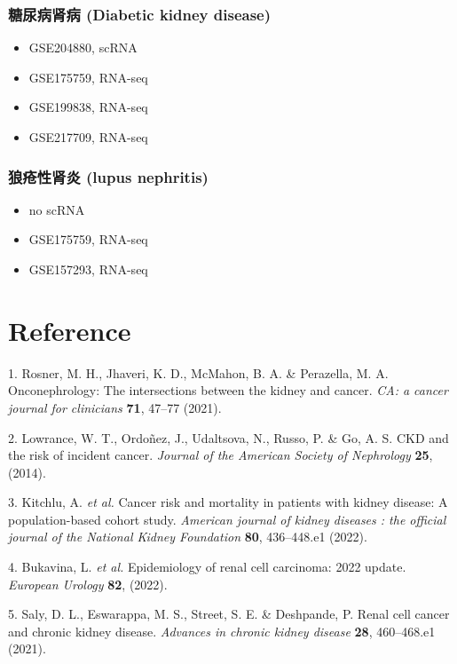 \documentclass[
]{article}
\providecommand{\tightlist}{%
  \setlength{\itemsep}{0pt}\setlength{\parskip}{0pt}}
\newenvironment{cslreferences}%
  {}%
  {\par}
\begin{document}
\hypertarget{ux7cd6ux5c3fux75c5ux80beux75c5-diabetic-kidney-disease}{%
\subsubsection{糖尿病肾病 (Diabetic kidney disease)}\label{ux7cd6ux5c3fux75c5ux80beux75c5-diabetic-kidney-disease}}

\begin{itemize}
\tightlist
\item
  GSE204880, scRNA
\item
  GSE175759, RNA-seq
\item
  GSE199838, RNA-seq
\item
  GSE217709, RNA-seq
\end{itemize}

\hypertarget{ux72fcux75aeux6027ux80beux708e-lupus-nephritis}{%
\subsubsection{狼疮性肾炎 (lupus nephritis)}\label{ux72fcux75aeux6027ux80beux708e-lupus-nephritis}}

\begin{itemize}
\tightlist
\item
  no scRNA
\item
  GSE175759, RNA-seq
\item
  GSE157293, RNA-seq
\end{itemize}

\hypertarget{bibliography}{%
\section*{Reference}\label{bibliography}}

\hypertarget{refs}{}
\begin{cslreferences}
\leavevmode\hypertarget{ref-OnconephrologyRosner2021}{}%
1. Rosner, M. H., Jhaveri, K. D., McMahon, B. A. \& Perazella, M. A. Onconephrology: The intersections between the kidney and cancer. \emph{CA: a cancer journal for clinicians} \textbf{71}, 47--77 (2021).

\leavevmode\hypertarget{ref-CkdAndTheRisLowran2014}{}%
2. Lowrance, W. T., Ordoñez, J., Udaltsova, N., Russo, P. \& Go, A. S. CKD and the risk of incident cancer. \emph{Journal of the American Society of Nephrology} \textbf{25}, (2014).

\leavevmode\hypertarget{ref-CancerRiskAndKitchl2022}{}%
3. Kitchlu, A. \emph{et al.} Cancer risk and mortality in patients with kidney disease: A population-based cohort study. \emph{American journal of kidney diseases : the official journal of the National Kidney Foundation} \textbf{80}, 436--448.e1 (2022).

\leavevmode\hypertarget{ref-EpidemiologyOfBukavi2022}{}%
4. Bukavina, L. \emph{et al.} Epidemiology of renal cell carcinoma: 2022 update. \emph{European Urology} \textbf{82}, (2022).

\leavevmode\hypertarget{ref-RenalCellCancSaly2021}{}%
5. Saly, D. L., Eswarappa, M. S., Street, S. E. \& Deshpande, P. Renal cell cancer and chronic kidney disease. \emph{Advances in chronic kidney disease} \textbf{28}, 460--468.e1 (2021).
\end{cslreferences}
\end{document}

